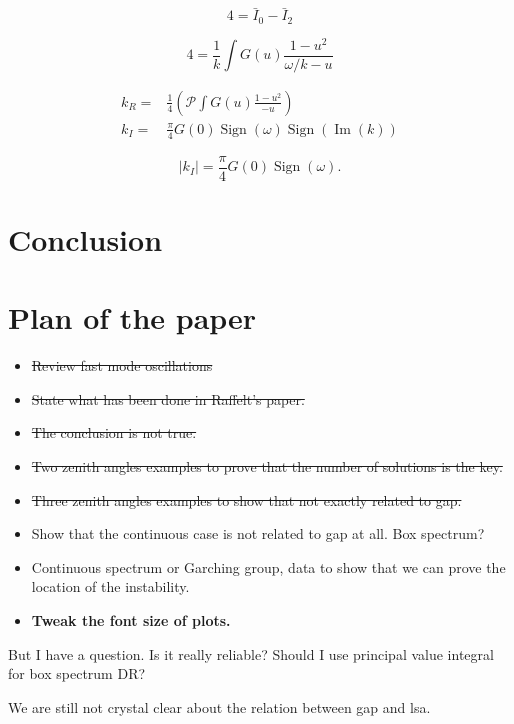 \documentclass[%
preprint,
 amsmath,amssymb,
 aps,
 prd
]{revtex4-1}
\begin{document}
\begin{equation}
   4 = \bar I_0 - \bar I_2
\end{equation}

\begin{equation}
   4 = \frac{1}{k} \int G(u) \frac{ 1 - u^2 }{ \omega/k - u }
\end{equation}

\begin{align}
k_R =& \frac{1}{4}\left(  \mathscr P \int G(u) \frac{ 1 - u^2 }{  - u }  \right) \\
k_I =&  \frac{\pi}{4}G(0) \operatorname{Sign}\left( \omega \right) \operatorname{Sign}\left(  \operatorname{Im}(k)  \right)
\end{align}


\begin{equation}
   \lvert k_I \rvert  =  \frac{\pi}{4}G(0) \operatorname{Sign}\left( \omega \right).
\end{equation}


\section{\label{sec-conclusion}Conclusion}























\appendix
\section{\label{sec-outline}Plan of the paper}



\begin{itemize}
    \item \sout{Review fast mode oscillations}
    \item \sout{State what has been done in Raffelt's paper.}
    \item \sout{The conclusion is not true.}
    \item \sout{Two zenith angles examples to prove that the number of solutions is the key.}
    \item \sout{Three zenith angles examples to show that not exactly related to gap.}
    \item Show that the continuous case is not related to gap at all. Box spectrum?
    \item Continuous spectrum or Garching group, data to show that we can prove the location of the instability.
    \item {\color{red}\bf Tweak the font size of plots.}
\end{itemize}


But I have a question. Is it really reliable? Should I use principal value integral for box spectrum DR?

We are still not crystal clear about the relation between gap and lsa.







\end{document}
